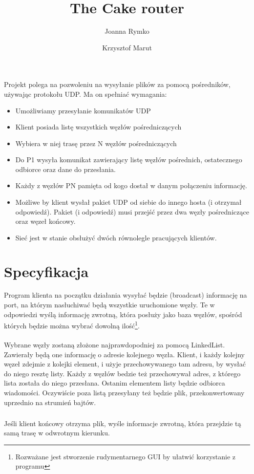 \documentclass[13p, a4paper, oneside]{article}
\begin{document}
\title{The Cake router}
\author{Joanna Rymko \and Krzysztof Marut}
\maketitle
\paragraph{} Projekt polega na pozwoleniu na wysyłanie plików za pomocą pośredników, używając protokołu UDP. Ma on spełniać wymagania:
\begin{itemize}
\item Umożliwiamy przesyłanie komunikatów UDP
\item Klient posiada listę wszystkich węzłów pośredniczących
\item Wybiera w niej trasę przez N węzłów pośredniczących
\item Do P1 wysyła komunikat zawierający listę węzłów pośrednich, ostatecznego odbiorce oraz dane do przesłania.
\item Każdy z węzłów PN pamięta od kogo dostał w danym połączeniu informację.
\item Możliwe by klient wysłał pakiet UDP od siebie do innego hosta (i otrzymał odpowiedź). Pakiet (i odpowiedź) musi przejść przez dwa węzły pośredniczące oraz węzeł końcowy.
\item Sieć jest w stanie obsłużyć dwóch równolegle pracujących klientów.
\end{itemize}
\section{Specyfikacja}
\paragraph{} Program klienta na początku działania wysyłać będzie (broadcast) informację na port, na którym nasłuchiwać będą wszystkie uruchomione węzły. Te w odpowiedzi wyślą informację zwrotną, która posłuży jako baza węzłów, spośród których będzie można wybrać dowolną ilość\footnote{Rozważane jest stworzenie rudymentarnego GUI by ułatwić korzystanie z programu}.
\paragraph{}Wybrane węzły zostaną złożone najprawdopodniej za pomocą LinkedList. Zawierały będą one informację o adresie kolejnego węzła. Klient, i każdy kolejny węzeł zdejmie z kolejki element, i użyje przechowywanego tam adresu, by wysłać do niego resztę listy. Każdy z węzłów bedzie też przechowywał adres, z którego lista została do niego przesłana. Ostanim elementem listy będzie odbiorca wiadomości. Oczywiście poza listą przesyłany też będzie plik, przekonwertowany uprzednio na strumień bajtów.
\subparagraph{}Jeśli klient końcowy otrzyma plik, wyśle informacje zwrotną, która przejdzie tą samą trasę w odwrotnym kierunku. 
\end{document}
